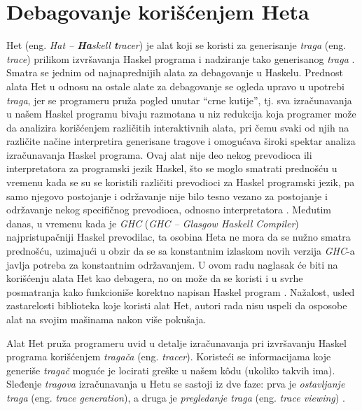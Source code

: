 \documentclass[a4paper]{article}
\begin{document}
{{\section{Debagovanje korišćenjem Heta}
Het (eng. {\em Hat -- {\bf \em Ha}skell {\bf \em t}racer}) je alat koji se koristi za generisanje {\em traga} (eng. {\em trace}) prilikom izvršavanja Haskel programa
i nadziranje tako generisanog {\em traga} \cite{chitil2002transforming}. Smatra se jednim od najnaprednijih alata za debagovanje u Haskelu. Prednost alata Het u odnosu na ostale alate za debagovanje 
se ogleda upravo u upotrebi {\em traga}, jer se programeru pruža pogled unutar ``crne kutije'', tj. sva izračunavanja u našem Haskel programu bivaju razmotana u niz redukcija koja programer može da analizira korišćenjem različitih interaktivnih alata, pri čemu svaki od njih na različite načine interpretira generisane tragove i omogućava široki spektar analiza izračunavanja Haskel programa.
Ovaj alat nije deo nekog prevodioca ili interpretatora za programski jezik Haskel,
što se moglo smatrati prednošću u vremenu kada se su se koristili različiti prevodioci za Haskel programski jezik, pa samo njegovo postojanje i održavanje nije bilo tesno vezano za postojanje i održavanje nekog specifičnog prevodioca, odnosno interpretatora \cite{chitil2002transforming}. Međutim danas, u vremenu kada je {\em GHC} ({\em GHC -- Glasgow Haskell Compiler}) najpristupačniji Haskel prevodilac, ta osobina Heta ne mora da se nužno smatra prednošću, uzimajući u obzir da se sa konstantnim izlaskom novih verzija {\em GHC}-a javlja potreba za konstantnim održavanjem.
U ovom radu naglasak će biti na korišćenju alata Het kao debagera, no on može da se koristi i u svrhe posmatranja kako funkcioniše korektno napisan Haskel program \cite{wallace2001multiple}.
Nažalost, usled zastarelosti biblioteka koje koristi alat Het, autori rada nisu uspeli da osposobe alat na svojim mašinama nakon više pokušaja. 

Alat Het pruža programeru uvid u detalje izračunavanja pri izvršavanju Haskel programa korišćenjem {\em tragača} (eng. {\em tracer}). 
Koristeći se informacijama koje generiše {\em tragač} moguće je locirati greške u našem k\^{o}du (ukoliko takvih ima).
Sleđenje {\em tragova} izračunavanja u Hetu se sastoji iz dve faze: prva je {\em ostavljanje traga} (eng. {\em trace generation}), a druga je {\em pregledanje traga} (eng. {\em trace viewing}) \cite{chitil2002transforming}.

}}
\end{document}
